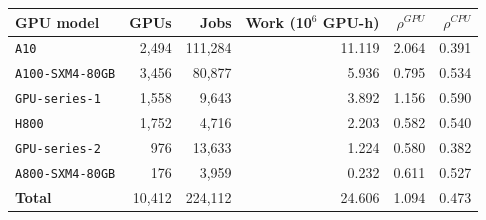 \begin{tabular}{lrrrrr}
\toprule
GPU model & GPUs & Jobs & Work (10$^6$ GPU-h) & $\rho^{GPU}$ & $\rho^{CPU}$\\
\midrule
\texttt{A10} & 2,494 & 111,284 & 11.119 & 2.064 & 0.391\\
\texttt{A100-SXM4-80GB} & 3,456 & 80,877 & 5.936 & 0.795 & 0.534\\
\texttt{GPU-series-1} & 1,558 & 9,643 & 3.892 & 1.156 & 0.590\\
\texttt{H800} & 1,752 & 4,716 & 2.203 & 0.582 & 0.540\\
\texttt{GPU-series-2} & 976 & 13,633 & 1.224 & 0.580 & 0.382\\
\texttt{A800-SXM4-80GB} & 176 & 3,959 & 0.232 & 0.611 & 0.527\\
\textbf{Total} & 10,412 & 224,112 & 24.606 & 1.094 & 0.473\\
\bottomrule
\end{tabular}
